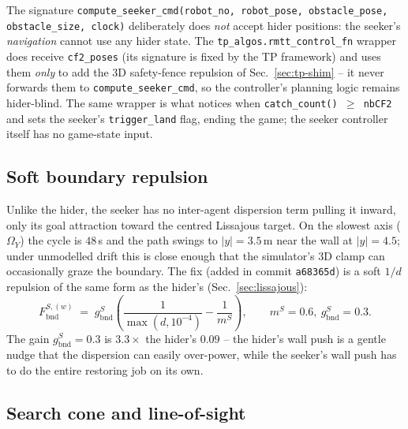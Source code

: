 \documentclass[11pt,a4paper]{article}
\newcommand{\code}[1]{\texttt{#1}}
\begin{document}
The signature \code{compute\_seeker\_cmd(robot\_no, robot\_pose,
obstacle\_pose, obstacle\_size, clock)} deliberately does \emph{not} accept
hider positions: the seeker's \emph{navigation} cannot use any hider state.
The \code{tp\_algos.rmtt\_control\_fn} wrapper does receive \code{cf2\_poses}
(its signature is fixed by the TP framework) and uses them \emph{only} to add
the 3D safety-fence repulsion of Sec.~\ref{sec:tp-shim} -- it never forwards
them to \code{compute\_seeker\_cmd}, so the controller's planning logic
remains hider-blind. The same wrapper is what notices when \code{catch\_count()
$\ge$ nbCF2} and sets the seeker's \code{trigger\_land} flag, ending the
game; the seeker controller itself has no game-state input.

\subsection{Soft boundary repulsion}
\label{sec:seeker-bnd}
Unlike the hider, the seeker has no inter-agent dispersion term pulling it
inward, only its goal attraction toward the centred Lissajous target. On
the slowest axis ($\Omega_Y$) the cycle is $48$\,s and the path swings to
$|y| = 3.5$\,m near the wall at $|y| = 4.5$; under unmodelled drift this is
close enough that the simulator's 3D clamp can occasionally graze the
boundary. The fix (added in commit \code{a68365d}) is a soft $1/d$
repulsion of the same form as the hider's (Sec.~\ref{sec:lissajous}):
\[
    F_\mathrm{bnd}^{S,(w)} \;=\; g_\mathrm{bnd}^S
    \!\left(\frac{1}{\max(d,10^{-4})} - \frac{1}{m^S}\right),
    \qquad m^S = 0.6,\ g_\mathrm{bnd}^S = 0.3.
\]
The gain $g_\mathrm{bnd}^S = 0.3$ is $3.3\times$ the hider's $0.09$ -- the
hider's wall push is a gentle nudge that the dispersion can easily
over-power, while the seeker's wall push has to do the entire restoring
job on its own.

\subsection{Search cone and line-of-sight}
\end{document}
